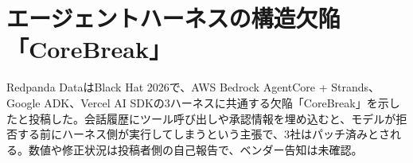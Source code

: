 \section{エージェントハーネスの構造欠陥「CoreBreak」}
Redpanda DataはBlack Hat 2026で、AWS Bedrock AgentCore + Strands、Google ADK、Vercel AI SDKの3ハーネスに共通する欠陥「CoreBreak」を示したと投稿した。会話履歴にツール呼び出しや承認情報を埋め込むと、モデルが拒否する前にハーネス側が実行してしまうという主張で、3社はパッチ済みとされる。数値や修正状況は投稿者側の自己報告で、ベンダー告知は未確認。
